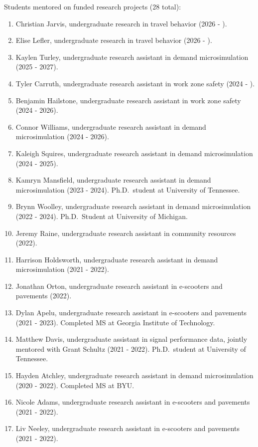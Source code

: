 \documentclass[margin,line]{res}
\newif\ifdetail{}
\newcounter{enuminitialize}
\newenvironment{myenum}[1][]
{%
 \setcounter{enuminitialize}{#1}
 \addtocounter{enuminitialize}{2}
 \begin{enumerate}[left= 4pt, itemsep=8pt, start=\value{enuminitialize}, label=\arabic*\addtocounter{enumi}{-2}]
}
{%
 \end{enumerate}
}
\begin{document}
\begin{resume}
Students mentored on funded research projects (28 total):
\vspace{0.2cm}
\begin{myenum}[33]
  \ifdetail {\color{NavyBlue} \fi
  \item Christian Jarvis, undergraduate research in travel behavior (2026 - ).
  \item Elise Lefler, undergraduate research in travel behavior (2026 - ).
  \item Kaylen Turley, undergraduate research assistant in demand microsimulation (2025 - 2027).
  \ifdetail } \fi
  \item Tyler Carruth, undergraduate research assistant in work zone safety (2024 - ).
  \item Benjamin Hailstone, undergraduate research assistant in work zone safety (2024 - 2026).
  \item Connor Williams, undergraduate research assistant in demand microsimulation (2024 - 2026).
  \item Kaleigh Squires, undergraduate research assistant in demand microsimulation (2024 - 2025).
  \item Kamryn Mansfield, undergraduate research assistant in demand microsimulation (2023 - 2024). Ph.D.\ student at University of Tennessee.
  \item Brynn Woolley, undergraduate research assistant in demand microsimulation (2022 - 2024). Ph.D.\ Student at University of Michigan.
  \item Jeremy Raine, undergraduate research assistant in community resources (2022). 
  \item Harrison Holdsworth, undergraduate research assistant in demand microsimulation (2021 - 2022). 
  \item Jonathan Orton, undergraduate research assistant in e-scooters and pavements (2022).
  \item Dylan Apelu, undergraduate research assistant in e-scooters and pavements (2021 - 2023). Completed MS at Georgia Institute of Technology.
  \item Matthew Davis, undergraduate assistant in signal performance data, jointly mentored with Grant Schultz (2021 - 2022). Ph.D.\ student at University of Tennessee.
  \item Hayden Atchley, undergraduate research assistant in demand microsimulation (2020 - 2022). Completed MS at BYU.
  \item Nicole Adams, undergraduate research assistant in e-scooters and pavements (2021 - 2022). 
  \item Liv Neeley, undergraduate research assistant in e-scooters and pavements (2021 - 2022). 

\end{myenum}
\end{resume}
\end{document}
